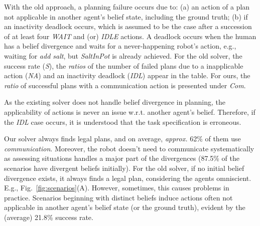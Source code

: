 \documentclass[letterpaper]{article} %
\begin{document}
With the old approach, a planning failure occurs due to: 
(a) an action of a plan not applicable in another agent's belief state, including the ground truth; 
(b) if an inactivity deadlock occurs, which is assumed to be the case after a succession of at least four \textit{WAIT} and (or) \textit{IDLE} actions. 
A deadlock occurs when the human has a belief divergence and waits for a never-happening robot's action, e.g., waiting for \textit{add salt}, but \textit{SaltInPot} is already achieved.
For the old solver, the success rate (\textit{S}), the \textit{ratios} of the number of failed plans due to a inapplicable action (\textit{NA}) and an inactivity deadlock (\textit{IDL}) appear in the table.
For ours, the \textit{ratio} of successful plans with a communication action is presented under \textit{Com}.

As the existing solver does not handle belief divergence in planning, the applicability of actions is never an issue w.r.t. another agent's belief. Therefore, if the \textit{IDL} case occurs, it is understood that the task specification is erroneous. 

Our solver always finds legal plans, and on average, \textit{approx.} 62\% of them use \textit{communication}.
Moreover, the robot doesn't need to communicate systematically as assessing situations handles a major part of the divergences (87.5\% of the scenarios have divergent beliefs initially).
For the old solver, if no initial belief divergence exists, it always finds a legal plan, considering the agents omniscient. 
E.g., Fig.~\ref{fig:scenarios}(A). However, sometimes, this causes problems in practice.
Scenarios beginning with distinct beliefs induce actions often not applicable in another agent's belief state (or the ground truth), evident by the (average) 21.8\% success rate.
\end{document}

